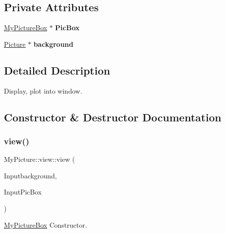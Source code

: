 \subsection*{Private Attributes}
\begin{DoxyCompactItemize}
\item 
\mbox{\label{class_my_picture_1_1view_a0ff0775584b6717c2f34308a3a360bcf}} 
\hyperlink{class_my_picture_1_1_my_picture_box}{My\+Picture\+Box} $\ast$ {\bfseries Pic\+Box}
\item 
\mbox{\label{class_my_picture_1_1view_a208384aaf7ede4f08c6e443b5c982c80}} 
\hyperlink{class_my_picture_1_1_picture}{Picture} $\ast$ {\bfseries background}
\end{DoxyCompactItemize}


\subsection{Detailed Description}
Display, plot into window. 



\subsection{Constructor \& Destructor Documentation}
\mbox{\label{class_my_picture_1_1view_ad50c4a8c0a51930e7ddd9e4f78d8e897}} 
\subsubsection{\texorpdfstring{view()}{view()}}
{\footnotesize\ttfamily My\+Picture\+::view\+::view (\begin{DoxyParamCaption}\item[{\hyperlink{class_my_picture_1_1_picture}{Picture} $\ast$}]{Inputbackground,  }\item[{\hyperlink{class_my_picture_1_1_my_picture_box}{My\+Picture\+Box} $\ast$}]{Input\+Pic\+Box }\end{DoxyParamCaption})\hspace{0.3cm}{\ttfamily [inline]}}



\hyperlink{class_my_picture_1_1_my_picture_box}{My\+Picture\+Box} Constructor. 


